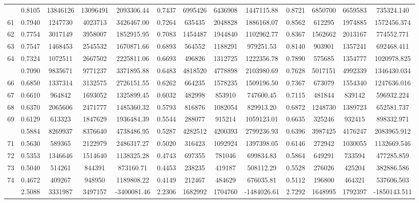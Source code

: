 \documentclass[
  12pt,
]{article}
\begin{document}
\begin{longtable}[t]{lcccccccccccc}
\addlinespace
60 & 0.8105 & 13846126 & 13096491 & 2093306.44 & 0.7437 & 6995426 & 6436908 & 1447115.88 & 0.8721 & 6850700 & 6659583 & 735324.140\\
61 & 0.7940 & 1247730 & 4023713 & 3426467.00 & 0.7264 & 635435 & 2048828 & 1886168.07 & 0.8562 & 612295 & 1974885 & 1572456.374\\
62 & 0.7754 & 3017149 & 3958007 & 1852915.95 & 0.7083 & 1454487 & 1944840 & 1102962.77 & 0.8367 & 1562662 & 2013167 & 774552.771\\
63 & 0.7547 & 1468453 & 2545532 & 1670871.66 & 0.6893 & 564552 & 1188291 & 979251.53 & 0.8140 & 903901 & 1357241 & 692468.411\\
64 & 0.7324 & 1072511 & 2667502 & 2225811.06 & 0.6693 & 496826 & 1312725 & 1222356.78 & 0.7890 & 575685 & 1354777 & 1020978.825\\
\addlinespace
65 & 0.7090 & 9835671 & 9771237 & 3371895.88 & 0.6483 & 4818520 & 4778898 & 2103980.69 & 0.7628 & 5017151 & 4992339 & 1346430.034\\
66 & 0.6850 & 1337314 & 3132575 & 2726151.55 & 0.6262 & 664235 & 1578235 & 1509196.50 & 0.7367 & 673079 & 1554340 & 1247636.016\\
67 & 0.6610 & 964842 & 1693052 & 1325899.45 & 0.6032 & 482998 & 853910 & 747600.45 & 0.7115 & 481844 & 839142 & 596932.224\\
68 & 0.6370 & 2065606 & 2471777 & 1485360.32 & 0.5793 & 816876 & 1082054 & 829913.20 & 0.6872 & 1248730 & 1389723 & 652581.737\\
69 & 0.6129 & 613323 & 1847629 & 1936484.39 & 0.5544 & 288077 & 915214 & 1059123.01 & 0.6635 & 325246 & 932415 & 898332.971\\
\addlinespace
70 & 0.5884 & 8269937 & 8376640 & 4738486.95 & 0.5287 & 4282512 & 4200393 & 2799236.93 & 0.6396 & 3987425 & 4176247 & 2083965.912\\
71 & 0.5630 & 589365 & 2122979 & 2486317.27 & 0.5020 & 316423 & 1092924 & 1397398.05 & 0.6146 & 272942 & 1030055 & 1132669.546\\
72 & 0.5353 & 1346646 & 1514640 & 1138325.28 & 0.4743 & 697355 & 781046 & 699834.83 & 0.5864 & 649291 & 733594 & 477285.859\\
73 & 0.5040 & 514261 & 844391 & 873160.71 & 0.4453 & 238235 & 419187 & 508112.29 & 0.5528 & 276026 & 425204 & 382886.586\\
74 & 0.4672 & 409267 & 948950 & 1189808.22 & 0.4149 & 212467 & 484629 & 676035.81 & 0.5112 & 196800 & 464321 & 537606.503\\
\addlinespace
75 & 2.5088 & 3331987 & 3497157 & -3400081.46 & 2.2306 & 1682992 & 1704760 & -1484026.61 & 2.7292 & 1648995 & 1792397 & -1850143.511\\*
\end{longtable}
\endgroup{}
\end{document}
